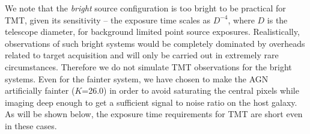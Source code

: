 \documentclass[a4paper,11pt]{article}
\begin{document}
We note that the \textit{bright} source configuration is too bright to
be practical for TMT, given its sensitivity -- the exposure time
scales as $D^{-4}$, where $D$ is the telescope diameter, for
background limited point source exposures. Realistically, observations
of such bright systems would be completely dominated by overheads
related to target acquisition and will only be carried out in
extremely rare circumstances. Therefore we do not simulate TMT
observations for the bright systems. Even for the fainter system, we
have chosen to make the AGN artificially fainter
($K$=26.0) in order to avoid saturating the central pixels while
imaging deep enough to get a sufficient signal to noise ratio on the
host galaxy. As will be shown below, the exposure time requirements
for TMT are short even in these cases.



\end{document}
